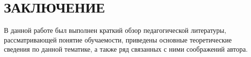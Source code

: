 \section*{ЗАКЛЮЧЕНИЕ}

В данной работе был выполнен краткий обзор педагогической литературы,
рассматривающей понятие обучаемости,
приведены основные теоретические сведения по данной тематике,
а также ряд связанных с ними соображений автора.

